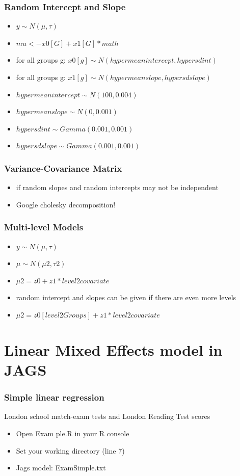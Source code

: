 \documentclass[hyperref={pdfpagelabels=false},unknownkeysallowed]{beamer}
\begin{document}
\begin{frame}
\frametitle{Random Intercept and Slope}
\begin{itemize}
\item $y \sim N(\mu,\tau)$
\item $mu <- x0[G] + x1[G] * math$
\item for all groups g: $x0[g] \sim N(hypermeanintercept,hypersdint)$
\item for all groups g: $x1[g] \sim N(hypermeanslope,hypersdslope)$
\item $hypermeanintercept \sim N(100,0.004)$
\item $hypermeanslope \sim N(0,0.001)$
\item $hypersdint \sim Gamma(0.001,0.001)$
\item $hypersdslope \sim Gamma(0.001,0.001)$
\end{itemize} 
\note{}
\end{frame}


\begin{frame}
\frametitle{Variance-Covariance Matrix}
\begin{itemize}
\item if random slopes and random intercepts may not be independent
\item Google cholesky decomposition! 
\end{itemize} 
\note{}
\end{frame}

\begin{frame}
\frametitle{Multi-level Models}
\begin{itemize}
\item $y \sim N(\mu,\tau)$
 \item $\mu \sim N(\mu2,\tau2)$
 \item $\mu2 = z0+z1*level2covariate$ 
 \item random intercept and slopes can be given if there are even more levels
  \item $\mu2 = z0[level2Groups]+z1*level2covariate$ 
 \end{itemize} 
\note{}
\end{frame}


\section{Linear Mixed Effects model in JAGS}

\begin{frame}
\frametitle{Simple linear regression}
London school match-exam tests and London Reading Test scores 
\begin{itemize}
\item Open Exam${\_}$ple.R in your R console
\item Set your working directory (line 7)
\item Jags model: ExamSimple.txt
\end{itemize}
\note{}
\end{frame}
\end{document}
